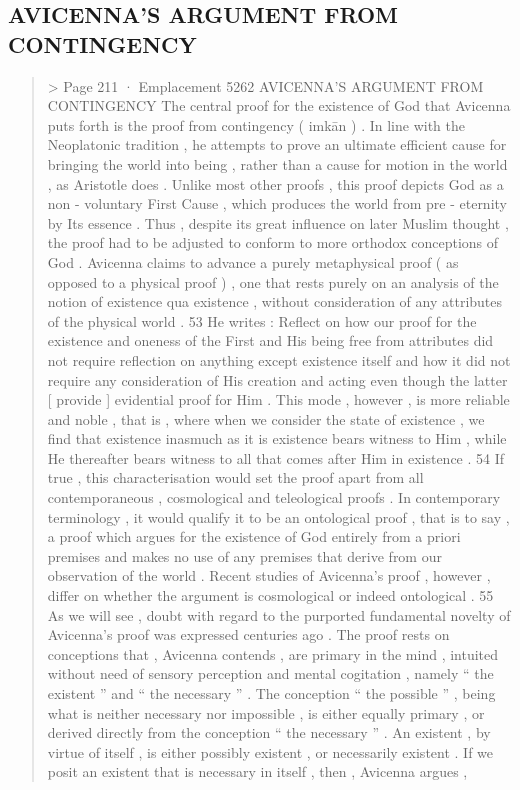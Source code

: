 \subsection{AVICENNA’S ARGUMENT FROM CONTINGENCY }
\begin{quote}> Page 211 · Emplacement 5262
AVICENNA’S ARGUMENT FROM CONTINGENCY The central proof for the existence of God that Avicenna puts forth is the proof from contingency ( imkān ) . In line with the Neoplatonic tradition , he attempts to prove an ultimate efficient cause for bringing the world into being , rather than a cause for motion in the world , as Aristotle does . Unlike
most other proofs , this proof depicts God as a non - voluntary First Cause , which produces the world from pre - eternity by Its essence . Thus , despite its great influence on later Muslim thought , the proof had to be adjusted to conform to more orthodox conceptions of God . Avicenna claims to advance a purely metaphysical proof ( as opposed to a physical proof ) , one that rests purely on an analysis of the notion of existence qua existence , without consideration of any attributes of the physical world . 53 He writes : Reflect on how our proof for the existence and oneness of the First and His being free from attributes did not require reflection on anything except existence itself and how it did not require any consideration of His creation and acting even though the latter [ provide ] evidential proof for Him . This mode , however , is more reliable and noble , that is , where when we consider the state of existence , we find that existence inasmuch as it is existence bears witness to Him , while He thereafter bears witness to all that comes after Him in existence . 54
If true , this characterisation would set the proof apart from all contemporaneous , cosmological and teleological proofs . In contemporary terminology , it would qualify it to be an ontological proof , that is to say , a proof which argues for the existence of God entirely from a priori premises and makes no use of any premises that derive from our observation of the world . Recent studies of Avicenna’s proof , however , differ on whether the argument is cosmological or indeed ontological . 55 As we will see , doubt with regard to the purported fundamental novelty of Avicenna’s proof was expressed centuries ago . The proof rests on conceptions that , Avicenna contends , are primary in the mind , intuited without need of sensory perception and mental cogitation , namely “ the existent ” and “ the necessary ” . The conception “ the possible ” , being what is neither necessary nor impossible , is either equally primary , or derived directly from the conception “ the necessary ” . An existent , by virtue of itself , is either possibly existent , or necessarily existent . If we posit an existent that is necessary in itself , then , Avicenna argues ,

\end{quote}
